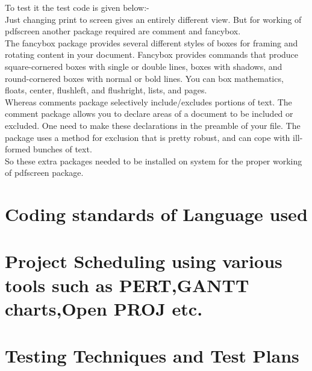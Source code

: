 \noindent To test it the test code is given below:-\\
Just changing print to screen gives an entirely different view. But for working of pdfscreen another package required are comment and fancybox.\\

\noindent The fancybox package provides several different styles of boxes for framing and rotating content in your document. Fancybox provides commands that produce square-cornered boxes with single or double lines, boxes with shadows, and round-cornered boxes with normal or bold lines. You can box mathematics, floats, center, flushleft, and flushright, lists, and pages.\\
 	
\noindent Whereas comments package selectively include/excludes portions of text. The comment package allows you to declare areas of a document to be included or excluded. One need to make these declarations in the preamble of your file. The package uses a method for exclusion that is pretty robust, and can cope with ill-formed bunches of text.\\

\noindent So these extra packages needed to be installed on system for the proper working of pdfscreen package.


	\section{Coding standards of Language used 
}
	\section{Project Scheduling using various tools such as PERT,GANTT charts,Open PROJ etc.
}
	\section{Testing Techniques and Test Plans
}